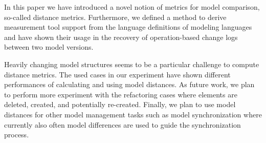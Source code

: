 In this paper we have introduced a novel notion of metrics for model comparison, so-called distance metrics. Furthermore, we defined a method to derive measurement tool support from the language definitions of modeling languages and have shown their usage in the recovery of operation-based change logs between two model versions. 

Heavily changing model structures seems to be a particular challenge to compute distance metrics. The used cases in our experiment have shown different performances of calculating and using model distances. As future work, we plan to perform more experiment with the refactoring cases where elements are deleted, created, and potentially re-created. Finally, we plan to use model distances for other model management tasks such as model synchronization where currently also often model differences are used to guide the synchronization process. 